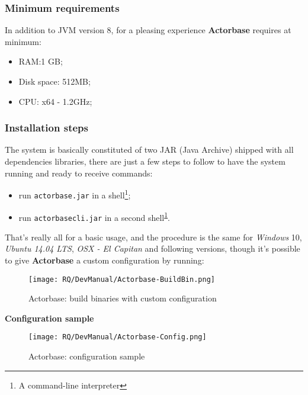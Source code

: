 \documentclass{scalatekids-article}
\begin{document}
\subsubsection{Minimum requirements}

In addition to JVM version 8, for a pleasing experience \textbf{Actorbase} requires at minimum:
\begin{itemize}
\item RAM:\@1 GB;\@
\item Disk space: 512MB;\@
\item CPU: x64 - 1.2GHz;
\end{itemize}

\subsubsection{Installation steps}

The system is basically constituted of two JAR (Java Archive) shipped with all
dependencies libraries, there are just a few steps to follow to have the system
running and ready to receive commands:
\begin{itemize}
\item run \verb=actorbase.jar= in a shell\footnote{A command-line interpreter\label{shell}};
\item run \verb=actorbasecli.jar= in a second shell\textsuperscript{\ref{shell}}.
\end{itemize}
That's really all for a basic usage, and the procedure is the same for
\textit{Windows} 10, \textit{Ubuntu 14.04 LTS}, \textit{OSX - El
  Capitan} and following versions, though it's possible to give \textbf{Actorbase} a custom configuration by
running:

\begin{figure}[H]
  \begin{center}
    \texttt{[image: RQ/DevManual/Actorbase-BuildBin.png]}
    \caption{Actorbase: build binaries with custom configuration}
  \end{center}
\end{figure}

\newpage
\textbf{Configuration sample}

\begin{figure}[H]
  \begin{center}
    \texttt{[image: RQ/DevManual/Actorbase-Config.png]}
    \caption{Actorbase: configuration sample}
  \end{center}
\end{figure}
\end{document}
